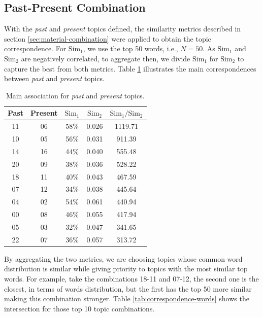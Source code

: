 \subsection{Past-Present Combination}

With the \textit{past} and \textit{present} topics defined, the similarity metrics described in section \ref{sec:material-combination} were applied to obtain the topic correspondence. For $\text{Sim}_{1}$, we use the top 50 words, i.e., $N=50$. As $\text{Sim}_{1}$ and $\text{Sim}_{2}$ are negatively correlated, to aggregate then, we divide $\text{Sim}_{1}$ for $\text{Sim}_{2}$ to capture the best from both metrics. Table \ref{tab:correspondence-score} illustrates the main correspondences between \textit{past} and \textit{present} topics.

\begin{table}[h!]
	\centering
	\caption{Main association for \textit{past} and \textit{present} topics.}
	\label{tab:correspondence-score}
	\begin{tabular}{cc|ccc}
		\toprule
		\textbf{Past} & \textbf{Present} & \textbf{$\text{Sim}_{1}$} & \textbf{$\text{Sim}_{2}$} & \textbf{$\text{Sim}_{1} / \text{Sim}_{2}$} \\ \midrule
		 11  &  06  & 58\% & 0.026 & 1119.71 \\
		 10  &  05  & 56\% & 0.031 & 911.39  \\
		 14  &  16  & 44\% & 0.040 & 555.48  \\
		 20  &  09  & 38\% & 0.036 & 528.22  \\
		 18  &  11  & 40\% & 0.043 & 467.59  \\
		 07  &  12  & 34\% & 0.038 & 445.64  \\
		 04  &  02  & 54\% & 0.061 & 440.94  \\
		 00  &  08  & 46\% & 0.055 & 417.94  \\
		 05  &  03  & 32\% & 0.047 & 341.65  \\
		 22  &  07  & 36\% & 0.057 & 313.72  \\ \bottomrule
	\end{tabular}
\end{table}

By aggregating the two metrics, we are choosing topics whose common word distribution is similar while giving priority to topics with the most similar top words. For example, take the combinations 18-11 and 07-12, the second one is the closest, in terms of words distribution, but the first has the top 50 more similar making this combination stronger. Table \ref{tab:correspondence-words} shows the intersection for those top 10 topic combinations.

